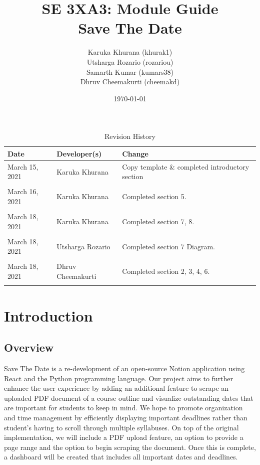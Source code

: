 \documentclass[12pt, titlepage]{article}
\title{SE 3XA3: Module Guide\\Save The Date}
\author{
        Karuka Khurana (khurak1)\\
        Utsharga Rozario (rozariou)\\
        Samarth Kumar (kumars38)\\
        Dhruv Cheemakurti (cheemakd)\\
}
\date{\today}
\begin{document}
\maketitle

\tableofcontents
\listoftables
\listoffigures

\newpage
\begin{table}[htbp]
    \caption{Revision History} \label{RevisionHistory}
    \begin{tabularx}{\textwidth}{llX}
        \toprule
            \textbf{Date} & \textbf{Developer(s)} & \textbf{Change}\\
        \midrule
            March 15, 2021 & Karuka Khurana & Copy template \& completed introductory section\\\\
            March 16, 2021 & Karuka Khurana & Completed section 5.\\\\
            March 18, 2021 & Karuka Khurana & Completed section 7, 8.\\\\
	 March 18, 2021 & Utsharga Rozario & Completed section 7 Diagram.\\\\
            March 18, 2021 & Dhruv Cheemakurti & Completed section 2, 3, 4, 6.\\\\
        \bottomrule
    \end{tabularx}
\end{table}

\newpage

\section{Introduction}
\subsection{Overview}
Save The Date is a re-development of an open-source Notion application using React and the Python programming language. Our project aims to further enhance the user experience by adding an additional feature to scrape an uploaded PDF document of a course outline and visualize outstanding dates that are important for students to keep in mind. We hope to promote organization and time management by efficiently displaying important deadlines rather than student’s having to scroll through multiple syllabuses. On top of the original implementation, we will include a PDF upload feature, an option to provide a page range and the option to begin scraping the document. Once this is complete, a dashboard will be created that includes all important dates and deadlines. 
\end{document}
